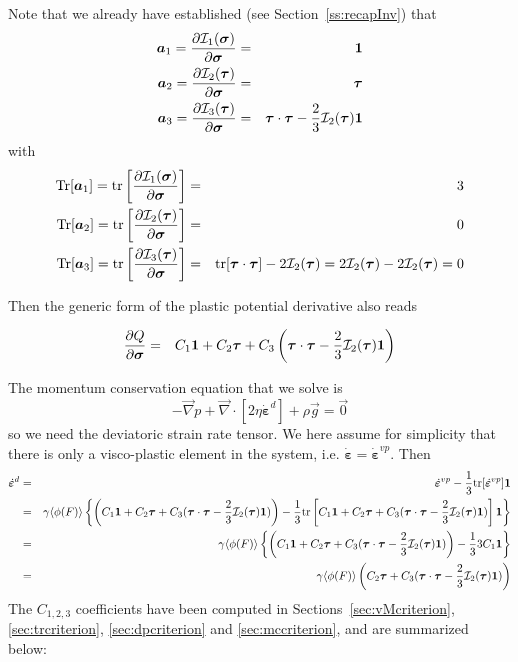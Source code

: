 \noindent Note that we already have established (see Section~\ref{ss:recapInv}) that  
\begin{eqnarray}
{\bm a}_1 =\frac{\partial {\cal I}_1(\bm\sigma)}{\partial \bm\sigma} &=& {\bm 1} \\
{\bm a}_2 =\frac{\partial {\cal I}_2(\bm\tau)}{\partial \bm\sigma} &=& {\bm \tau} \\
{\bm a}_3 =\frac{\partial {\cal I}_3(\bm\tau)}{\partial \bm\sigma} 
&=& \bm\tau\cdot\bm\tau -\frac23  {\cal I}_2(\bm\tau){\bm 1}
\end{eqnarray}
with
\begin{eqnarray}
\textrm{Tr}[{\bm a}_1]=
{\rm tr}\left[ \frac{\partial {\cal I}_1(\bm\sigma)}{\partial \bm\sigma} \right] &=& 3 \\  
\textrm{Tr}[{\bm a}_2]=
{\rm tr}\left[ \frac{\partial {\cal I}_2(\bm\tau)}{\partial \bm\sigma}   \right] &=& 0 \\
\textrm{Tr}[{\bm a}_3]=
{\rm tr}\left[ \frac{\partial {\cal I}_3(\bm\tau)}{\partial \bm\sigma}   \right] &=& {\rm tr}[\bm\tau\cdot\bm\tau] - 2  {\cal I}_2(\bm\tau) = 2  {\cal I}_2(\bm\tau) -2  {\cal I}_2(\bm\tau) = 0 
\end{eqnarray}

Then the generic form of the plastic potential derivative also reads
\begin{mdframed}[backgroundcolor=blue!5]
\begin{eqnarray}
\frac{\partial Q}{\partial \bm\sigma}
&=&
C_1 {\bm 1} 
+
C_2 {\bm \tau} 
+
C_3  \left( \bm\tau\cdot\bm\tau - \frac23  {\cal I}_2(\bm\tau)  {\bm 1} \right)
\end{eqnarray}
\end{mdframed}

The momentum conservation equation that we solve is 
\[
-\vec\nabla p + \vec\nabla \cdot \left[
2 \eta \dot{\bm\varepsilon}^d 
\right]+ \rho \vec g = \vec 0
\]
so we need the deviatoric strain rate tensor. 
We here assume for simplicity that there is only a visco-plastic element in the system, 
i.e. $\dot{\bm\varepsilon}=\dot{\bm\varepsilon}^{vp}$.
Then 
\begin{eqnarray}
\dot{\bm\varepsilon}^d 
&=& \dot{\bm\varepsilon}^{vp} - \frac13 {\rm tr}[ \dot{\bm\varepsilon}^{vp}] {\bm 1} \nonumber\\
&=& \gamma \langle \phi(F) \rangle 
\left\{
\left(C_1 \bm 1 + C_2 \bm\tau + C_3 (\bm\tau\cdot\bm\tau-\frac23 {\cal I}_2(\bm\tau)\bm 1)\right)
-\frac13
{\rm tr}
\left[C_1 \bm 1 + C_2 \bm\tau + C_3 (\bm\tau\cdot\bm\tau-\frac23 {\cal I}_2(\bm\tau)\bm 1)\right]
\bm 1
\right\} \nonumber\\
&=& \gamma \langle \phi(F) \rangle 
\left\{
\left(C_1 \bm 1 + C_2 \bm\tau + C_3 (\bm\tau\cdot\bm\tau-\frac23 {\cal I}_2(\bm\tau)\bm 1)\right)
-\frac13 3C_1
\bm 1
\right\} \nonumber\\
&=& \gamma \langle \phi(F) \rangle 
\left(C_2 \bm\tau + C_3 (\bm\tau\cdot\bm\tau-\frac23 {\cal I}_2(\bm\tau)\bm 1)\right)
\end{eqnarray}
The $C_{1,2,3}$ coefficients have been computed in 
Sections~\ref{sec:vMcriterion}, \ref{sec:trcriterion}, \ref{sec:dpcriterion} and 
\ref{sec:mccriterion}, and are summarized below: 

